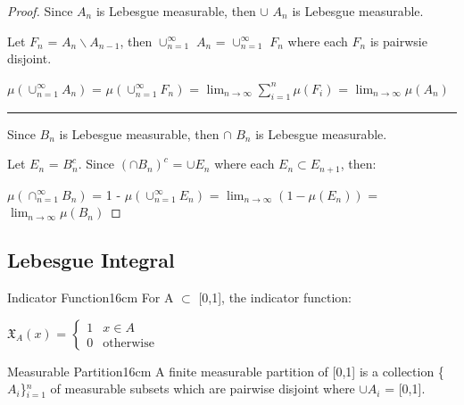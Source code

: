     \begin{proof}
        Since $A_n$ is Lebesgue measurable, then $\cup$ $A_n$ is
        Lebesgue measurable.

        Let $F_n$ = $A_n \backslash A_{n-1}$, then
        $\cup_{n=1}^{\infty}$ $A_n$ = $\cup_{n=1}^{\infty}$ $F_n$
        where each $F_n$ is pairwsie disjoint.

        \hspace{0.5cm}
        $\mu(\cup_{n=1}^{\infty} A_n)$
        = $\mu(\cup_{n=1}^{\infty} F_n)$
        = $\lim_{n \rightarrow \infty} \sum_{i=1}^n \mu(F_i)$
        = $\lim_{n \rightarrow \infty} \mu(A_n)$

        \rule[0.1cm]{15.2cm}{0.01cm}

        Since $B_n$ is Lebesgue measurable, then $\cap$ $B_n$ is
        Lebesgue measurable.

        Let $E_n$ = $B_n^c$. Since $(\cap B_n)^c$ = $\cup E_n$
        where each $E_n \subset E_{n+1}$, then:

        \hspace{0.5cm}
        $\mu(\cap_{n=1}^{\infty} B_n)$
        = 1 - $\mu(\cup_{n=1}^{\infty} E_n)$
        = $\lim_{n \rightarrow \infty} (1 - \mu(E_n))$
        = $\lim_{n \rightarrow \infty} \mu(B_n)$
    \end{proof}

    \newpage





\subsection{ Lebesgue Integral }

    \begin{definition}{Indicator Function}{16cm}
        For A $\subset$ [0,1], the indicator function:

        \hspace{0.5cm}
        $\mathfrak{X}_A(x)$ =
        $\begin{cases}
            1 & x \in A \\
            0 & \text{otherwise}
        \end{cases}$
    \end{definition}

    \vspace{0.5cm}



    \begin{definition}{Measurable Partition}{16cm}
        A finite {\color{lblue} measurable partition} of [0,1] is a
        collection \{$A_i$\}$_{i=1}^n$ of measurable subsets
        which are pairwise disjoint where $\cup A_i$ = [0,1].
    \end{definition}

